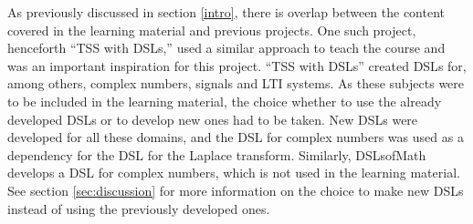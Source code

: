\begin{newtext}
As previously discussed in section \ref{intro}, there is overlap between the content covered in the learning material and previous projects.
One such project, henceforth ``TSS with DSLs,'' used a similar approach to teach the course  and was an important inspiration for this project. ``TSS with DSLs'' created \gls{DSL}s for, among others, complex numbers, signals and LTI systems. %
As these subjects were to be included in the learning material, the choice whether to use the already developed \gls{DSL}s or to develop new ones had to be taken. 
New \gls{DSL}s were developed for all these domains, and the \gls{DSL} for complex numbers was used as a dependency for the \gls{DSL} for the Laplace transform. 
Similarly, \gls{DSLsofMath} develops a \gls{DSL} for complex numbers, which is not used in the learning material. 
See section \ref{sec:discussion} for more information on the choice to make new \gls{DSL}s instead of using the previously developed ones.
\end{newtext}


